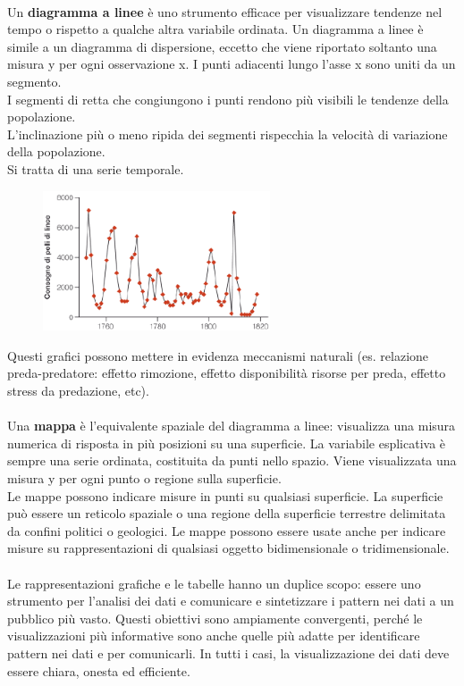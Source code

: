 \documentclass[10pt, draft]{book}
\begin{document}
\\
Un \textbf{diagramma a linee} è uno strumento efficace per visualizzare tendenze nel tempo o rispetto a qualche altra variabile ordinata. Un diagramma a linee è simile a un diagramma di dispersione, eccetto che viene riportato soltanto una misura y per ogni osservazione x. I punti adiacenti lungo l'asse x sono uniti da un segmento.
\\
I segmenti di retta che congiungono i punti rendono più visibili le tendenze della popolazione. 
\\
L'inclinazione più o meno ripida dei segmenti rispecchia la velocità di variazione della popolazione.
\\
Si tratta di una serie temporale.
    \begin{figure}[h]\label{fig2.5-2}
    \centering
    \includegraphics[width=0.6\textwidth]{fig2.5-2}
    \caption{\small{}}
    \end{figure}
Questi grafici possono mettere in evidenza meccanismi naturali (es. relazione preda-predatore: effetto rimozione, effetto disponibilità risorse per preda, effetto stress da predazione, etc).
\\
\\
Una \textbf{mappa} è l'equivalente spaziale del diagramma a linee: visualizza una misura numerica di risposta in più posizioni su una superficie. La variabile esplicativa è sempre una serie ordinata, costituita da punti nello spazio. Viene visualizzata una misura y per ogni punto o regione sulla superficie.
\\
Le mappe possono indicare misure in punti su qualsiasi superficie. La superficie può essere un reticolo spaziale o una regione della superficie terrestre delimitata da confini politici o geologici. Le mappe possono essere usate anche per indicare misure su rappresentazioni di qualsiasi oggetto bidimensionale o tridimensionale.
\\
\\
Le rappresentazioni grafiche e le tabelle hanno un duplice scopo: essere uno strumento per l'analisi dei dati e comunicare e sintetizzare i pattern nei dati a un pubblico più vasto. Questi obiettivi sono ampiamente convergenti, perché le visualizzazioni più informative sono anche quelle più adatte per identificare pattern nei dati e per comunicarli. In tutti i casi, la visualizzazione dei dati deve essere chiara, onesta ed efficiente.
\end{document}
